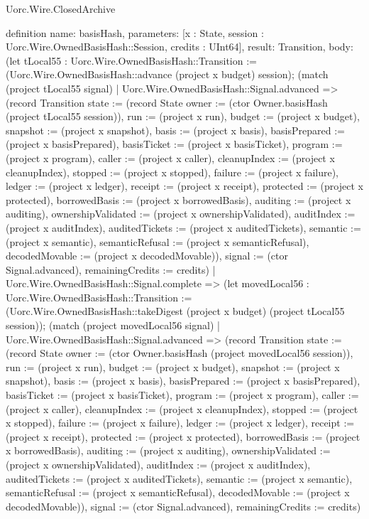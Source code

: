 \begin{lexlean}{Uorc.Wire.ClosedArchive}
\begin{semanticmodule}
definition{
  name: basisHash,
  parameters: [x : State, session : Uorc.Wire.OwnedBasisHash::Session, credits : UInt64],
  result: Transition,
  body: (let tLocal55 : Uorc.Wire.OwnedBasisHash::Transition := (Uorc.Wire.OwnedBasisHash::advance (project x budget) session); (match (project tLocal55 signal)
    | Uorc.Wire.OwnedBasisHash::Signal.advanced => (record Transition {state := (record State {owner := (ctor Owner.basisHash (project tLocal55 session)), run := (project x run), budget := (project x budget), snapshot := (project x snapshot), basis := (project x basis), basisPrepared := (project x basisPrepared), basisTicket := (project x basisTicket), program := (project x program), caller := (project x caller), cleanupIndex := (project x cleanupIndex), stopped := (project x stopped), failure := (project x failure), ledger := (project x ledger), receipt := (project x receipt), protected := (project x protected), borrowedBasis := (project x borrowedBasis), auditing := (project x auditing), ownershipValidated := (project x ownershipValidated), auditIndex := (project x auditIndex), auditedTickets := (project x auditedTickets), semantic := (project x semantic), semanticRefusal := (project x semanticRefusal), decodedMovable := (project x decodedMovable)}), signal := (ctor Signal.advanced), remainingCredits := credits})
    | Uorc.Wire.OwnedBasisHash::Signal.complete => (let movedLocal56 : Uorc.Wire.OwnedBasisHash::Transition := (Uorc.Wire.OwnedBasisHash::takeDigest (project x budget) (project tLocal55 session)); (match (project movedLocal56 signal)
      | Uorc.Wire.OwnedBasisHash::Signal.advanced => (record Transition {state := (record State {owner := (ctor Owner.basisHash (project movedLocal56 session)), run := (project x run), budget := (project x budget), snapshot := (project x snapshot), basis := (project x basis), basisPrepared := (project x basisPrepared), basisTicket := (project x basisTicket), program := (project x program), caller := (project x caller), cleanupIndex := (project x cleanupIndex), stopped := (project x stopped), failure := (project x failure), ledger := (project x ledger), receipt := (project x receipt), protected := (project x protected), borrowedBasis := (project x borrowedBasis), auditing := (project x auditing), ownershipValidated := (project x ownershipValidated), auditIndex := (project x auditIndex), auditedTickets := (project x auditedTickets), semantic := (project x semantic), semanticRefusal := (project x semanticRefusal), decodedMovable := (project x decodedMovable)}), signal := (ctor Signal.advanced), remainingCredits := credits})
}
\end{semanticmodule}
\end{lexlean}
